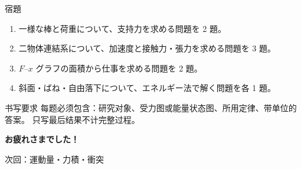 \documentclass[notheorems,aspectratio=169]{beamer}
\begin{document}
\begin{frame}{宿題}
  \begin{enumerate}
    \item 一様な棒と荷重について、支持力を求める問題を 2 題。
    \item 二物体連結系について、加速度と接触力・張力を求める問題を 3 題。
    \item $F$--$x$ グラフの面積から仕事を求める問題を 2 題。
    \item 斜面・ばね・自由落下について、エネルギー法で解く問題を各 1 題。
  \end{enumerate}

  \vfill
  \begin{alertblock}{书写要求}
    每题必须包含：研究对象、受力图或能量状态图、所用定律、带单位的答案。
    只写最后结果不计完整过程。
  \end{alertblock}
\end{frame}

\begin{frame}[plain]
  \vfill
  \centering
  {\Huge\color{JapanBlue}\bfseries お疲れさまでした！}

  \vspace{1.2em}
  {\Large 次回：運動量・力積・衝突}
  \vfill
\end{frame}
\end{document}
